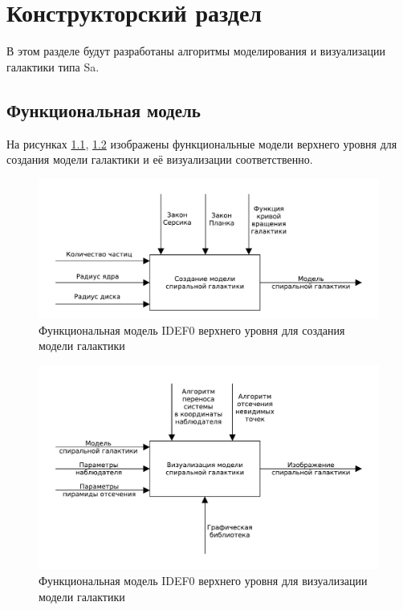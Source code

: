 \chapter{Конструкторский раздел}
\label{cha:design}

В этом разделе будут разработаны алгоритмы моделирования и визуализации галактики типа Sa.

\section{Функциональная модель}

На рисунках \ref{img:idef0_simulation}, \ref{img:idef0_rendering} изображены функциональные модели верхнего уровня для создания модели галактики и её визуализации соответственно.

\begin{figure}[H]
    \centering
    \includegraphics[scale=0.6]{pdf/idef0_simulation.pdf}
    \caption{Функциональная модель IDEF0 верхнего уровня для создания модели галактики}
    \label{img:idef0_simulation}
\end{figure}

\begin{figure}[H]
    \centering
    \includegraphics[scale=0.6]{pdf/idef0_rendering.pdf}
    \caption{Функциональная модель IDEF0 верхнего уровня для визуализации модели галактики}
    \label{img:idef0_rendering}
\end{figure}

